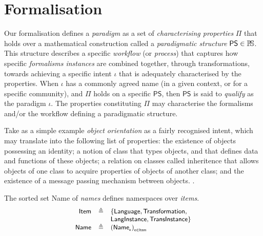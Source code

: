 \section{Formalisation}
\label{sec:Formalisation}

Our formalisation defines a \emph{paradigm} as a set of 
\emph{characterising properties} $\mathsf{\Pi}$ that holds over a mathematical 
construction called a \emph{paradigmatic structure} $\mathsf{PS}\in \mathbb{P}\!\mathbb{S}$. 
This structure describes a specific \emph{workflow} (or \emph{process}) that 
captures how specific \emph{formalisms instances} are combined together, 
through transformations, towards achieving a specific intent $\iota$ that is 
adequately characterised by the properties. When $\iota$ has a commonly agreed 
name (in a given context, or for a specific community), and $\mathsf{\Pi}$ holds 
on a specific $\mathsf{PS}$, then $\mathsf{PS}$ is said to \emph{qualify} as 
the paradigm $\iota$. The properties constituting $\mathsf{\Pi}$ may 
characterise the formalisms and/or the workflow defining a paradigmatic 
structure. 

Take as a simple example \emph{object orientation} as a fairly recognised 
intent, which may translate into the following list of properties: the 
existence of objects possessing an identity; a notion of class that types 
objects, and that defines data and functions of these objects; a relation on 
classes called inheritence that allows objects of one class to acquire 
properties of objects of another class; and the existence of a message passing 
mechanism between objects. 
. 


\begin{Definition}[Names]
   The sorted set \textsf{Name} of \emph{names} defines namespaces over 
\emph{items}.
   \begin{displaymath}
   \begin{small}
     \begin{array}{rcl}
		\mathsf{Item} & \eqdef & \{\mathsf{Language}, \mathsf{Transformation}, \\
                    &        & \mathsf{LangInstance}, \mathsf{TransInstance}\}\\
		\mathsf{Name}    & \eqdef & (\mathsf{Name}_{_{\mathsf{e}}})_{_{\mathsf{e} 
\in \mathsf{Item}}}
      \end{array}
   \end{small}
\end{displaymath}
\end{Definition}


